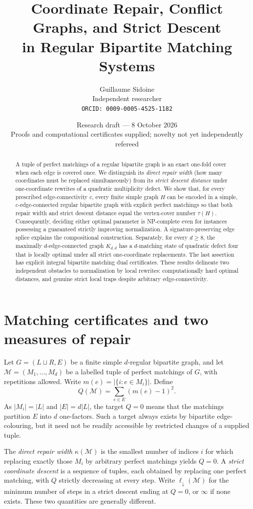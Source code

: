 \documentclass[10pt]{article}
\title{Coordinate Repair, Conflict Graphs, and Strict Descent\\in Regular Bipartite Matching Systems}
\author{Guillaume Sidoine\\Independent researcher\\\texttt{ORCID: 0009-0005-4525-1182}}
\date{Research draft --- 8 October 2026\\\small Proofs and computational certificates supplied; novelty not yet independently refereed}
\newcommand{\M}{\mathcal M}
\begin{document}
\maketitle
\begin{abstract}
A tuple of perfect matchings of a regular bipartite graph is an exact one-fold cover when each edge is covered once. We distinguish its \emph{direct repair width} (how many coordinates must be replaced simultaneously) from its \emph{strict descent distance} under one-coordinate rewrites of a quadratic multiplicity defect. We show that, for every prescribed edge-connectivity $c$, every finite simple graph $H$ can be encoded in a simple, $c$-edge-connected regular bipartite graph with explicit perfect matchings so that both repair width and strict descent distance equal the vertex-cover number $\tau(H)$. Consequently, deciding either optimal parameter is NP-complete even for instances possessing a guaranteed strictly improving normalization. A signature-preserving edge splice explains the compositional construction. Separately, for every $d\ge8$, the maximally $d$-edge-connected graph $K_{d,d}$ has a $d$-matching state of quadratic defect four that is locally optimal under all strict one-coordinate replacements. The last assertion has explicit integral bipartite matching dual certificates. These results delineate two independent obstacles to normalization by local rewrites: computationally hard optimal distances, and genuine strict local traps despite arbitrary edge-connectivity.
\end{abstract}

\section{Matching certificates and two measures of repair}
Let $G=(L\sqcup R,E)$ be a finite simple $d$-regular bipartite graph, and let $\M=(M_1,\ldots,M_d)$ be a labelled tuple of perfect matchings of $G$, with repetitions allowed. Write $m(e)=|\{i:e\in M_i\}|$. Define
\begin{equation}\label{eq:q}
 Q(\M)=\sum_{e\in E}(m(e)-1)^2.
\end{equation}
As $|M_i|=|L|$ and $|E|=d|L|$, the target $Q=0$ means that the matchings partition $E$ into $d$ one-factors. Such a target always exists by bipartite edge-colouring, but it need not be readily accessible by restricted changes of a supplied tuple.

The \emph{direct repair width} $\kappa(\M)$ is the smallest number of indices $i$ for which replacing exactly those $M_i$ by arbitrary perfect matchings yields $Q=0$. A \emph{strict coordinate descent} is a sequence of tuples, each obtained by replacing one perfect matching, with $Q$ strictly decreasing at every step. Write $\ell_\downarrow(\M)$ for the minimum number of steps in a strict descent ending at $Q=0$, or $\infty$ if none exists. These two quantities are generally different.
\end{document}
